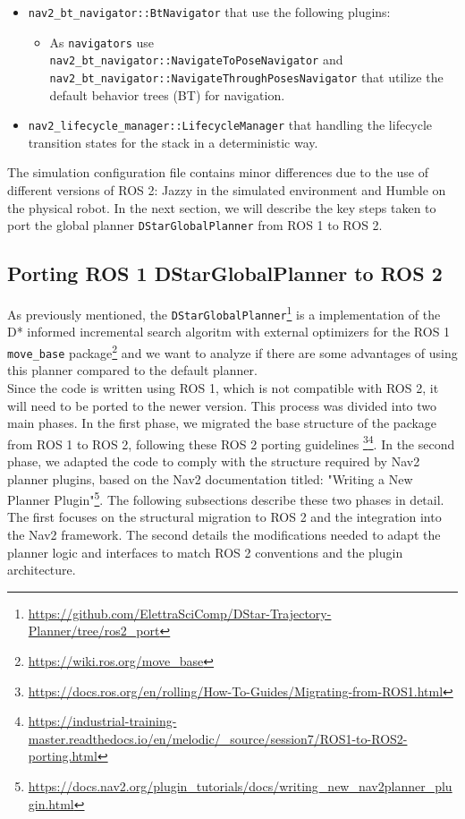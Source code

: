 \begin{itemize}
	\item \texttt{nav2\_bt\_navigator::BtNavigator} that use the following plugins:
	\begin{itemize}
		\item As \texttt{navigators} use\\ \texttt{nav2\_bt\_navigator::NavigateToPoseNavigator} and\\ \texttt{nav2\_bt\_navigator::NavigateThroughPosesNavigator} that utilize the default behavior trees (BT) for navigation.
	\end{itemize}
	
	\item \texttt{nav2\_lifecycle\_manager::LifecycleManager} that handling the lifecycle transition states for the stack in a deterministic way.
\end{itemize}
The simulation configuration file contains minor differences due to the use of different versions of ROS 2: Jazzy in the simulated environment and Humble on the physical robot.
In the next section, we will describe the key steps taken to port the global planner \texttt{DStarGlobalPlanner} from ROS 1 to ROS 2.
\newpage 
\subsection{Porting ROS 1 DStarGlobalPlanner to ROS 2}
As previously mentioned, the \texttt{DStarGlobalPlanner}\footnote{\href{https://github.com/ElettraSciComp/DStar-Trajectory-Planner/tree/ros2_port}{https://github.com/ElettraSciComp/DStar-Trajectory-Planner/tree/ros2\_port}} is a implementation of the D* informed incremental search algoritm with external optimizers\cite{10.1007/978-3-031-67295-8_33} for the ROS 1 \texttt{move\_base} package\footnote{\href{https://wiki.ros.org/move_base}{https://wiki.ros.org/move\_base}} 
\alert{and we want to analyze if there are some advantages of using this planner compared to the default planner.}\\
Since the code is written using ROS 1\alert{, which is not compatible with ROS 2, it will need to be ported to the newer version}. This process was divided into two main phases. In the first phase, we migrated the base structure of the package from ROS 1 to ROS 2, following these ROS 2 porting guidelines \footnote{\href{https://docs.ros.org/en/rolling/How-To-Guides/Migrating-from-ROS1.html}{https://docs.ros.org/en/rolling/How-To-Guides/Migrating-from-ROS1.html}}\footnote{\href{https://industrial-training-master.readthedocs.io/en/melodic/\_source/session7/ROS1-to-ROS2-porting.html}{https://industrial-training-master.readthedocs.io/en/melodic/\_source/session7/ROS1-to-ROS2-porting.html}}. In the second phase, we adapted the code to comply with the structure required by Nav2 planner plugins, based on the Nav2 documentation titled: "Writing a New Planner Plugin"\footnote{\href{https://docs.nav2.org/plugin_tutorials/docs/writing_new_nav2planner_plugin.html}{https://docs.nav2.org/plugin\_tutorials/docs/writing\_new\_nav2planner\_plugin.html}}.
The following subsections describe these two phases in detail. The first focuses on the structural migration to ROS 2 and the integration into the Nav2 framework. The second details the modifications needed to adapt the planner logic and interfaces to match ROS 2 conventions and the plugin architecture.
